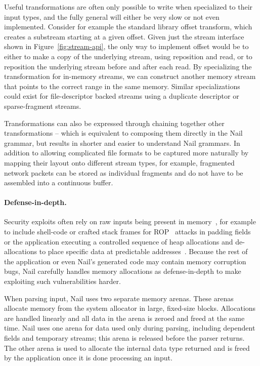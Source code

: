 Useful transformations are often only possible to write when specialized to their input types, and the fully general will either be very slow or not even implemented. Consider for example the standard library offset transform, which creates a substream starting at a given offset. Given just the stream interface shown in Figure~\ref{fig:stream-api}, the only way to implement offset would be to either to make a copy of the underlying stream, using reposition and read, or to reposition the underlying stream before and after each read. By specializing the transformation for in-memory streams, we can construct another memory stream that points to the correct range in the same memory. Similar specializations could exist for file-descriptor backed streams using a duplicate descriptor or sparse-fragment streams.


Transformations can also be expressed through chaining together other transformations -- which is equivalent to composing them directly in the Nail grammar, but results in shorter and easier to understand Nail grammars.
In addition to allowing complicated file formats to be captured more naturally by mapping their layout onto different stream types, for example, fragmented network packets can be stored as individual fragments and do not have to be assembled into a continuous buffer.

\paragraph{Defense-in-depth.}

Security exploits often rely on raw inputs being present in memory~\cite{shotgun-parser}, for example to include
shell-code or crafted stack frames for ROP~\cite{phrack58:4-nergal} attacks in padding fields or the
application executing a controlled sequence of heap allocations and de-allocations to place
specific data at predictable addresses~\cite{jp-advanced, vudo-malloc}. Because the rest of the
application or even Nail's generated code may contain memory corruption bugs, Nail
carefully handles memory allocations as defense-in-depth to make exploiting such vulnerabilities harder.

When parsing input, Nail uses two separate memory arenas. These arenas allocate memory from the
system allocator in large, fixed-size blocks. Allocations are handled linearly and all data in the
arena is zeroed and freed at the same time. Nail uses one arena for data used only during parsing,
including dependent fields and temporary streams; this arena is released before the parser returns.
The other arena is used to allocate the internal data type returned and is freed by the application
once it is done processing an input. 

